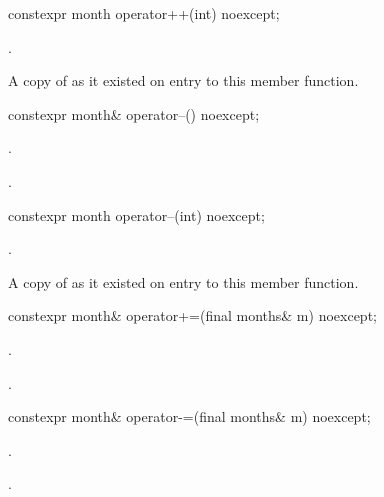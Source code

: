 %
\begin{itemdecl}
constexpr month operator++(int) noexcept;
\end{itemdecl}

\begin{itemdescr}
\pnum
\effects {}.

\pnum
\returns A copy of  as it existed on entry to this member function.
\end{itemdescr}

%
\begin{itemdecl}
constexpr month& operator--() noexcept;
\end{itemdecl}

\begin{itemdescr}
\pnum
\effects {}.

\pnum
\returns {}.
\end{itemdescr}

%
\begin{itemdecl}
constexpr month operator--(int) noexcept;
\end{itemdecl}

\begin{itemdescr}
\pnum
\effects {}.

\pnum
\returns A copy of  as it existed on entry to this member function.
\end{itemdescr}

%
\begin{itemdecl}
constexpr month& operator+=(final months& m) noexcept;
\end{itemdecl}

\begin{itemdescr}
\pnum
\effects {}.

\pnum
\returns {}.
\end{itemdescr}

%
\begin{itemdecl}
constexpr month& operator-=(final months& m) noexcept;
\end{itemdecl}

\begin{itemdescr}
\pnum
\effects {}.

\pnum
\returns {}.
\end{itemdescr}


